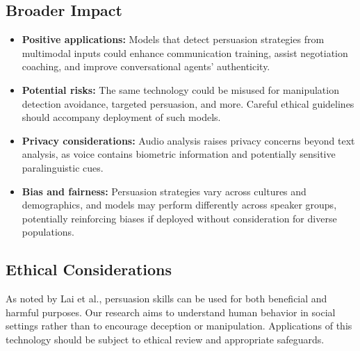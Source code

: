 \documentclass{article}
\begin{document}
\subsection{Broader Impact}
\begin{itemize}
    \item \textbf{Positive applications:} Models that detect persuasion strategies from multimodal inputs could enhance communication training, assist negotiation coaching, and improve conversational agents' authenticity.
    
    \item \textbf{Potential risks:} The same technology could be misused for manipulation detection avoidance, targeted persuasion, and more. Careful ethical guidelines should accompany deployment of such models.
    
    \item \textbf{Privacy considerations:} Audio analysis raises privacy concerns beyond text analysis, as voice contains biometric information and potentially sensitive paralinguistic cues.
    
    \item \textbf{Bias and fairness:} Persuasion strategies vary across cultures and demographics, and models may perform differently across speaker groups, potentially reinforcing biases if deployed without consideration for diverse populations.
\end{itemize}

\subsection{Ethical Considerations}
As noted by Lai et al., persuasion skills can be used for both beneficial and harmful purposes. Our research aims to understand human behavior in social settings rather than to encourage deception or manipulation. Applications of this technology should be subject to ethical review and appropriate safeguards.


\end{document}
